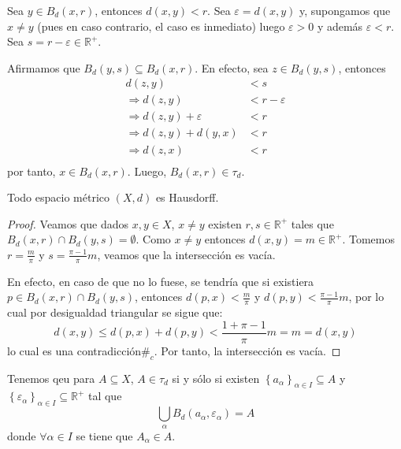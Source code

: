 \documentclass[12pt]{report}
\theoremstyle{largebreak}
\newcommand\contradiction{\ensuremath{\#_c}}
\begin{document}
    \begin{sol}
        Sea $y\in B_d(x,r)$, entonces $d(x,y)<r$. Sea $\varepsilon=d(x,y)$ y, supongamos que $x\neq y$ (pues en caso contrario, el caso es inmediato) luego $\varepsilon>0$ y además $\varepsilon<r$. Sea $s=r-\varepsilon\in\mathbb{R}^+$.

        Afirmamos que $B_d(y,s)\subseteq B_d(x,r)$. En efecto, sea $z\in B_d(y,s)$, entonces
        \begin{equation*}
            \begin{split}
                d(z,y)&<s\\
                \Rightarrow d(z,y)&<r-\varepsilon\\
                \Rightarrow d(z,y)+\varepsilon&<r\\
                \Rightarrow d(z,y)+d(y,x)&<r\\
                \Rightarrow d(z,x)&<r\\
            \end{split}
        \end{equation*}
        por tanto, $x\in B_d(x,r)$. Luego, $B_d(x,r)\in\tau_d$.
    \end{sol}

    \begin{lema}
        Todo espacio métrico $(X,d)$ es Hausdorff. 
    \end{lema}

    \begin{proof}
        Veamos que dados $x,y\in X$, $x\neq y$ existen $r,s\in\mathbb{R}^+$ tales que $B_d(x,r)\cap B_d(y,s)=\emptyset$. Como $x\neq y$ entonces $d(x,y)=m\in\mathbb{R}^+$. Tomemos $r=\frac{m}{\pi}$ y $s=\frac{\pi-1}{\pi}m$, veamos que la intersección es vacía.
    
        En efecto, en caso de que no lo fuese, se tendría que si existiera $p\in B_d(x,r)\cap B_d(y,s)$, entonces $d(p,x)<\frac{m}{\pi}$ y $d(p,y)<\frac{\pi-1}{\pi}m$, por lo cual por desigualdad triangular se sigue que:
        \begin{equation*}
            d(x,y)\leq d(p,x)+d(p,y)<\frac{1+\pi-1}{\pi}m=m=d(x,y)
        \end{equation*}
        lo cual es una contradicción\contradiction. Por tanto, la intersección es vacía.
    \end{proof}

    Tenemos qeu para $A\subseteq X$, $A\in\tau_d$ si y sólo si existen $\left\{a_\alpha\right\}_{\alpha\in I}\subseteq A$ y $\left\{\varepsilon_\alpha\right\}_{\alpha\in I}\subseteq\mathbb{R}^+$ tal que
    \begin{equation*}
        \bigcup_{\alpha}B_d(a_\alpha,\varepsilon_\alpha)=A
    \end{equation*}
    donde $\forall\alpha\in I$ se tiene que $A_\alpha\in A$.
\end{document}
